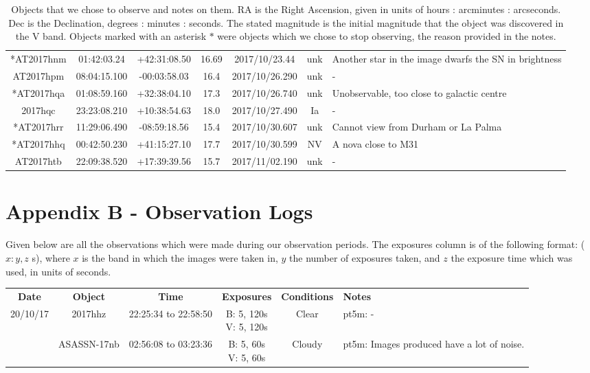 \documentclass[twocolumn]{revtex4}
\begin{document}
{\begin{table}[h!]
\begin{tabularx}{\textwidth}{c c c c @{\hskip 5pt} c c X}
    *AT2017hnm & 01:42:03.24 & +42:31:08.50 & 16.69 & 2017/10/23.44 & unk & {Another star in the image dwarfs the SN in brightness}  \\
    AT2017hpm & 08:04:15.100 & -00:03:58.03 & 16.4 & 2017/10/26.290 & unk & {-}  \\
    *AT2017hqa & 01:08:59.160 & +32:38:04.10 & 17.3 & 2017/10/26.740 & unk & {Unobservable, too close to galactic centre}  \\
    2017hqc & 23:23:08.210 & +10:38:54.63 & 18.0 & 2017/10/27.490 & Ia & {-}  \\
    *AT2017hrr & 11:29:06.490 & -08:59:18.56 & 15.4 & 2017/10/30.607 & unk & {Cannot view from Durham or La Palma}  \\
    *AT2017hhq & 00:42:50.230 & +41:15:27.10 & 17.7 & 2017/10/30.599 & NV & {A nova close to M31}  \\
    AT2017htb & 22:09:38.520 & +17:39:39.56 & 15.7 & 2017/11/02.190 & unk & {-}  \\
    \hline      
\end{tabularx}
\caption{Objects that we chose to observe and notes on them. RA is the Right Ascension, given in units of hours : arcminutes : arcseconds. Dec is the Declination, degrees : minutes : seconds. The stated magnitude is the initial magnitude that the object was discovered in the V band. Objects marked with an asterisk $*$ were objects which we chose to stop observing, the reason provided in the notes.}
\label{objects}
\end{table}


\clearpage

\onecolumngrid
\vspace{-3ex}
\section*{Appendix B - Observation Logs} \label{obslogs}
\vspace{-2ex}
Given below are all the observations which were made during our observation periods. The exposures column is of the following format: ($x: y, z$ s), where $x$ is the band in which the images were taken in, $y$ the number of exposures taken, and $z$ the exposure time which was used, in units of seconds.
{\renewcommand{\arraystretch}{1.2}%
\begin{table}[h!]
\centering    
\begin{tabularx}{\textwidth}{c@{\hskip 5pt} c c@{\hskip 5pt} c@{\hskip 5pt} c@{\hskip 5pt} X}
    \hline
    \textbf{Date} & \textbf{Object} & \textbf{Time} & \textbf{Exposures} & \textbf{  Conditions  } & \textbf{Notes} \\ 
    20/10/17 & 2017hhz & 22:25:34 to 22:58:50 & \makecell{B: 5, 120s \\ V: 5, 120s} & {Clear} & {pt5m: -}  \\
    	& ASASSN-17nb &  02:56:08 to 03:23:36 & \makecell{B: 5, 60s \\ V: 5, 60s} & {Cloudy} & {pt5m: Images produced have a lot of noise.} \\      
	

\end{tabularx}
\end{table}}}
\end{document}
